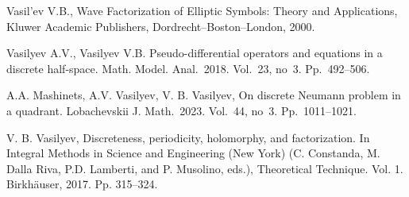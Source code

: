 \documentclass[12pt]{llncs}
\begin{document}



\begin{thebibliography}{9} %

 Vasil'ev V.B., Wave Factorization of Elliptic Symbols: Theory and Applications,
Kluwer Academic Publishers, Dordrecht--Boston--London, 2000.

 Vasilyev A.V., Vasilyev V.B. Pseudo-differential operators and equations
in a discrete half-space. Math. Model. Anal.~2018. Vol.~23, no~3. Pp.~492--506.

 A.A. Mashinets, A.V. Vasilyev, V. B. Vasilyev, On discrete Neumann problem in a quadrant. Lobachevskii J. Math.~2023. Vol.~44, no~3. Pp.~1011--1021.


 V. B. Vasilyev, Discreteness, periodicity, holomorphy, and factorization. In Integral
Methods in Science and Engineering (New York) (C. Constanda, M. Dalla
Riva, P.D. Lamberti, and P. Musolino, eds.), Theoretical Technique. Vol. 1.
Birkh\"auser, 2017. Pp. 315--324.





\end{thebibliography}
\end{document}
